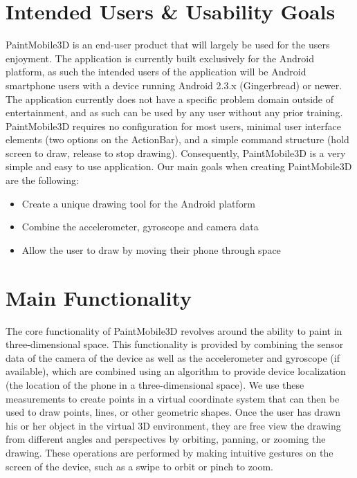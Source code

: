 \documentclass{chi-ext}
\begin{document}
\section{Intended Users \& Usability Goals}

PaintMobile3D is an end-user product that will largely be used for the users enjoyment. The application is currently built exclusively for the Android platform, as such the intended users of the application will be Android smartphone users with a device running Android 2.3.x (Gingerbread) or newer. The application currently does not have a specific problem domain outside of entertainment, and as such can be used by any user without any prior training. PaintMobile3D requires no configuration for most users, minimal user interface elements (two options on the ActionBar), and a simple command structure (hold screen to draw, release to stop drawing). Consequently, PaintMobile3D is a very simple and easy to use application. Our main goals when creating PaintMobile3D are the following:

\begin{itemize}
\item
Create a unique drawing tool for the Android platform
\item
Combine the accelerometer, gyroscope and camera data
\item
Allow the user to draw by moving their phone through space
\end{itemize}

\section{Main Functionality}

The core functionality of PaintMobile3D revolves around the ability to paint in three-dimensional space. This functionality is provided by combining the sensor data of the camera of the device as well as the accelerometer and gyroscope (if available), which are combined using an algorithm to provide device localization (the location of the phone in a three-dimensional space). We use these measurements to create points in a virtual coordinate system that can then be used to draw points, lines, or other geometric shapes. Once the user has drawn his or her object in the virtual 3D environment, they are free view the drawing from different angles and perspectives by orbiting, panning, or zooming the drawing. These operations are performed by making intuitive gestures on the screen of the device, such as a swipe to orbit or pinch to zoom.
\end{document}
